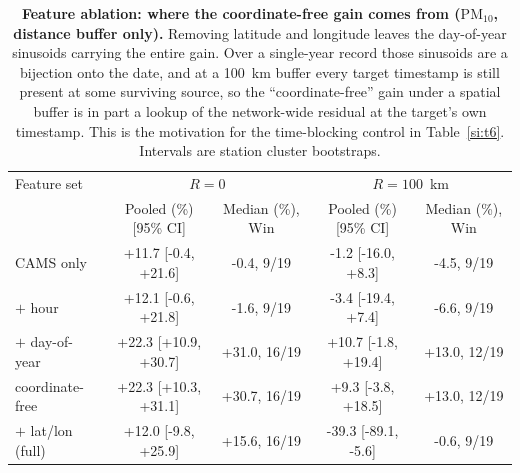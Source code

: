 \documentclass[11pt]{article}
\newcommand*{\pmten}{\ensuremath{\mathrm{PM_{10}}}}
\begin{document}
\begin{table}[htbp]\centering\footnotesize
\caption{\textbf{Feature ablation: where the coordinate-free gain comes from (\pmten{}, distance buffer only).} Removing latitude and longitude leaves the day-of-year sinusoids carrying the entire gain. Over a single-year record those sinusoids are a bijection onto the date, and at a 100~km buffer every target timestamp is still present at some surviving source, so the ``coordinate-free'' gain under a spatial buffer is in part a lookup of the network-wide residual at the target's own timestamp. This is the motivation for the time-blocking control in Table~\ref{si:t6}. Intervals are station cluster bootstraps.}
\label{si:t21}
\begin{tabular}{lcccc}\toprule
Feature set & \multicolumn{2}{c}{$R=0$} & \multicolumn{2}{c}{$R=100$~km} \\
 & Pooled (\%) [95\% CI] & Median (\%), Win & Pooled (\%) [95\% CI] & Median (\%), Win \\ \midrule
CAMS only & +11.7 [-0.4, +21.6] & -0.4, 9/19 & -1.2 [-16.0, +8.3] & -4.5, 9/19 \\
$+$ hour & +12.1 [-0.6, +21.8] & -1.6, 9/19 & -3.4 [-19.4, +7.4] & -6.6, 9/19 \\
$+$ day-of-year & +22.3 [+10.9, +30.7] & +31.0, 16/19 & +10.7 [-1.8, +19.4] & +13.0, 12/19 \\
coordinate-free & +22.3 [+10.3, +31.1] & +30.7, 16/19 & +9.3 [-3.8, +18.5] & +13.0, 12/19 \\
$+$ lat/lon (full) & +12.0 [-9.8, +25.9] & +15.6, 16/19 & -39.3 [-89.1, -5.6] & -0.6, 9/19 \\
\bottomrule\end{tabular}\end{table}
\end{document}

